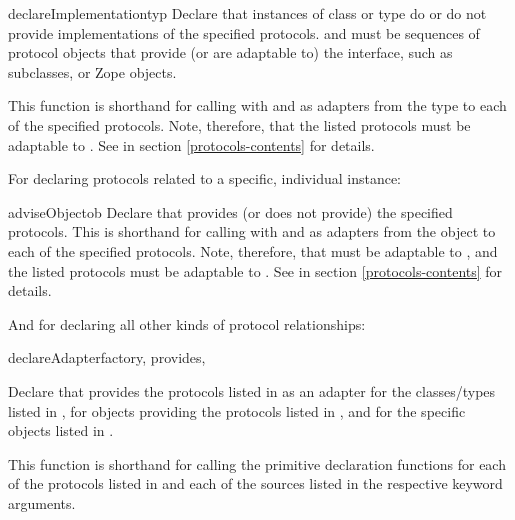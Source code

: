 \begin{verbatim%
}
\begin{verbatim%
}
\begin{verbatim%
}
\begin{verbatim%
}
\begin{funcdesc}{declareImplementation}{typ
 }
Declare that instances of class or type  do or do not provide
implementations of the specified protocols.   and
 must be sequences of protocol objects that
provide (or are adaptable to) the  interface,
such as  subclasses, or Zope 
objects.

This function is shorthand for calling 
with  and  as adapters
from the type to each of the specified protocols.  Note, therefore, that the
listed protocols must be adaptable to .  See
 in section \ref{protocols-contents} for
details.
\end{funcdesc}


For declaring protocols related to a specific, individual instance:

\begin{funcdesc}{adviseObject}{ob
 }
Declare that  provides (or does not provide) the specified protocols.
This is shorthand for calling 
with  and  as adapters
from the object to each of the specified protocols.  Note, therefore, that
 must be adaptable to , and the listed protocols
must be adaptable to .  See
 in section \ref{protocols-contents} for
details.
\end{funcdesc}







And for declaring all other kinds of protocol relationships:

\begin{funcdesc}{declareAdapter}{factory, provides,
 
}

Declare that  provides the protocols listed in 
as an adapter for the classes/types listed in , for objects
providing the protocols listed in , and for the specific
objects listed in .

This function is shorthand for calling the primitive declaration
functions for each of the protocols listed in  and each of the
sources listed in the respective keyword arguments.
\end{funcdesc}


\end{verbatim%
}
\end{verbatim%
}
\end{verbatim%
}
\end{verbatim%
}
